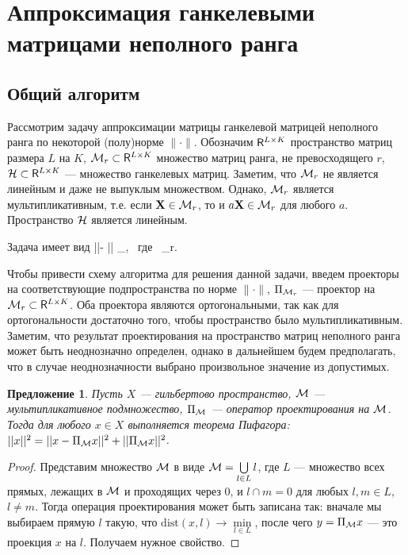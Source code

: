 \documentclass[12pt,a4paper,fleqn,leqno]{article}
\newtheorem{proposition}{Предложение}%
\begin{document}
\section{Аппроксимация ганкелевыми матрицами неполного ранга}
\label{sec:lowrank_appr}
\subsection{Общий алгоритм}
Рассмотрим задачу аппроксимации матрицы ганкелевой матрицей неполного ранга по некоторой (полу)норме $\|\cdot\|$.
Обозначим $\mathsf{R}^{L\times K}$ пространство матриц размера $L$ на $K$, $\mathcal{M}_r\subset \mathsf{R}^{L\times K}$ множество матриц ранга, не превосходящего $r$,
$\mathcal{H} \subset \mathsf{R}^{L\times K}$ --- множество ганкелевых матриц.
Заметим, что  $\mathcal{M}_r$ не является линейным и даже не выпуклым множеством. Однако, $\mathcal{M}_r$ является мультипликативным, т.е.
если $\mathbf{X}\in \mathcal{M}_r$, то и $a\mathbf{X}\in \mathcal{M}_r$ для любого $a$.
Пространство $\mathcal{H}$ является линейным.

Задача имеет вид
\be
\label{eq:gen_task}
||\bfX - \bfY|| \to \min_\bfY, \mbox{\ где\ } \bfY \in \calH \cap \calM_r.
\ee

Чтобы привести схему алгоритма для решения данной задачи, введем проекторы на соответствующие подпространства
по норме $\|\cdot\|$, $\Pi_{\mathcal{M}_r}$ --- проектор на $\mathcal{M}_r\subset \mathsf{R}^{L\times K}$. Оба проектора являются ортогональными,
так как для ортогональности достаточно того, чтобы пространство было мультипликативным. Заметим, что результат проектирования
на пространство матриц неполного ранга может быть неоднозначно определен, однако в дальнейшем будем предполагать, что
в случае неоднозначности выбрано произвольное значение из допустимых.

\begin{proposition} \label{pythaprop}
Пусть $X$ --- гильбертово пространство, $\mathcal{M}$ --- мультипликативное подмножество, $\Pi_{\mathcal{M}}$ --- оператор проектирования на $\mathcal{M}$. Тогда для любого $x \in X$ выполняется теорема Пифагора: $||x||^2 = ||x - \Pi_{\mathcal{M}} x||^2 + ||\Pi_{\mathcal{M}} x||^2$.
\end{proposition}
\begin{proof}
Представим множество $\mathcal{M}$ в виде $\mathcal{M} = \bigcup\limits_{l \in L}l$, где $L$ --- множество всех прямых, лежащих в $\mathcal{M}$ и проходящих через $0$, и $l \cap m = 0$ для любых $l, m \in L$, $l \neq m$. Тогда операция проектирования может быть записана так: вначале мы выбираем прямую $l$ такую, что $\text{dist}(x, l) \rightarrow \min\limits_{l \in L}$, после чего $y = \Pi_{\mathcal{M}} x$ --- это проекция $x$ на $l$. Получаем нужное свойство.
\end{proof}
\end{document}
